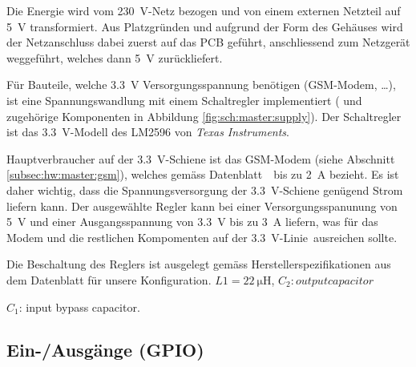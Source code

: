 Die  Energie wird  vom  \SI{230}{\volt}-Netz bezogen  und  von einem  externen
Netzteil auf \SI{5}{\volt} transformiert. Aus  Platzgr\"unden und aufgrund der
Form des Geh\"auses wird der Netzanschluss dabei zuerst auf das PCB gef\"uhrt,
anschliessend  zum   Netzger\"at  weggef\"uhrt,  welches   dann  \SI{5}{\volt}
zur\"uckliefert.

F\"ur   Bauteile,  welche   \SI{3.3}{\volt}  Versorgungsspannung   ben\"otigen
(GSM-Modem,  \ldots),  ist  eine   Spannungswandlung  mit  einem  Schaltregler
implementiert   (   und   zugeh\"orige  Komponenten   in   Abbildung
\ref{fig:sch:master:supply}). Der Schaltregler  ist das \SI{3.3}{\volt}-Modell
des LM2596 von \emph{Texas Instruments}.

Hauptverbraucher   auf   der   \SI{3.3}{\volt}-Schiene   ist   das   GSM-Modem
(siehe     Abschnitt     \ref{subsec:hw:master:gsm}),     welches     gem\"ass
Datenblatt~\cite{ref:sim900:1}~bis   zu    \SI{2}{\ampere}   bezieht. Es   ist
daher  wichtig,  dass   die  Spannungsversorgung  der  \SI{3.3}{\volt}-Schiene
gen\"ugend  Strom  liefern  kann. Der  ausgew\"ahlte  Regler  kann  bei  einer
Versorgungsspanunung   von  \SI{5}{\volt}   und  einer   Ausgangsspannung  von
\SI{3.3}{\volt} bis  zu \SI{3}{\ampere} liefern,  was f\"ur das Modem  und die
restlichen Kompomenten auf  der \SI{3.3}{\volt}-Linie~ausreichen
sollte.

Die Beschaltung  des Reglers ist ausgelegt  gem\"ass Herstellerspezifikationen
aus dem Datenblatt \cite{ref:lm2596} f\"ur unsere Konfiguration.
$L1 = \SI{22}{\micro\henry}$, $C_2: output capacitor$

$C_1$: input bypass capacitor.



\clearpage
\subsection{Ein-/Ausg\"ange (GPIO)}
\label{subsec:hw:master:gpio}

